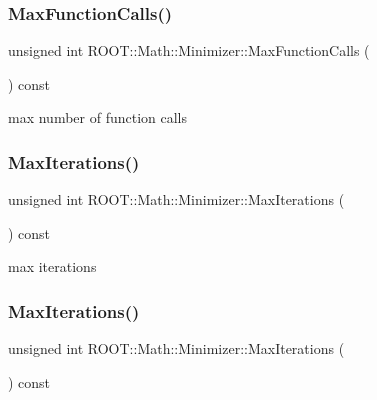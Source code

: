 \subsubsection{\texorpdfstring{MaxFunctionCalls()}{MaxFunctionCalls()}\hspace{0.1cm}{\footnotesize\ttfamily [2/2]}}
{\footnotesize\ttfamily unsigned int R\+O\+O\+T\+::\+Math\+::\+Minimizer\+::\+Max\+Function\+Calls (\begin{DoxyParamCaption}{ }\end{DoxyParamCaption}) const\hspace{0.3cm}{\ttfamily [inline]}}



max number of function calls 

\mbox{\label{classROOT_1_1Math_1_1Minimizer_a472e2b4a5d108a378f6905d67c680afc}} 
\subsubsection{\texorpdfstring{MaxIterations()}{MaxIterations()}\hspace{0.1cm}{\footnotesize\ttfamily [1/2]}}
{\footnotesize\ttfamily unsigned int R\+O\+O\+T\+::\+Math\+::\+Minimizer\+::\+Max\+Iterations (\begin{DoxyParamCaption}{ }\end{DoxyParamCaption}) const\hspace{0.3cm}{\ttfamily [inline]}}



max iterations 

\mbox{\label{classROOT_1_1Math_1_1Minimizer_a472e2b4a5d108a378f6905d67c680afc}} 
\subsubsection{\texorpdfstring{MaxIterations()}{MaxIterations()}\hspace{0.1cm}{\footnotesize\ttfamily [2/2]}}
{\footnotesize\ttfamily unsigned int R\+O\+O\+T\+::\+Math\+::\+Minimizer\+::\+Max\+Iterations (\begin{DoxyParamCaption}{ }\end{DoxyParamCaption}) const\hspace{0.3cm}{\ttfamily [inline]}}



